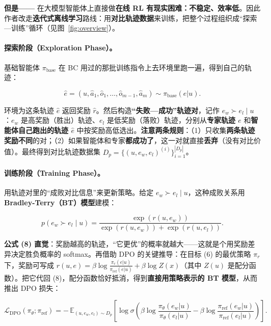 \documentclass[11pt,UTF8,fontset=fandol]{ctexart}
\begin{document}
\textbf{但是——} 在大模型智能体上直接做\textbf{在线 RL 有现实困难：不稳定、效率低}。因此作者改走\textbf{迭代式离线学习}路线：用\textbf{对比轨迹数据}来训练，把整个过程组织成“探索—训练”循环（见图~\ref{fig:overview}）。

\paragraph{探索阶段（Exploration Phase）。} 基础智能体 $\pi_{\text{base}}$ 在 BC 用过的那批训练指令上去环境里跑一遍，得到自己的轨迹：

\begin{equation*}
\hat{e} = (u, \hat{a}_1, \hat{o}_1, \dots, \hat{o}_{m-1}, \hat{a}_m) \sim \pi_{\text{base}}(e|u). \tag{7}
\end{equation*}

环境为这条轨迹 $\hat{e}$ 返回奖励 $\hat{r}$。然后构造\textbf{“失败—成功”轨迹对}，记作 $e_w \succ e_l \mid u$：$e_w$ 是高奖励（胜出）轨迹、$e_l$ 是低奖励（落败）轨迹，分别从\textbf{专家轨迹 $e$} 和\textbf{智能体自己跑出的轨迹 $\hat{e}$} 中按奖励高低选出。\textbf{注意两条规则}：（1）只收集\textbf{两条轨迹奖励不同}的对；（2）如果智能体和专家\textbf{都成功了}，这一对就直接\textbf{丢弃}（没有对比价值）。最终得到对比轨迹数据集 $D_p = \{(u, e_w, e_l)^{(i)}\}_{i=1}^{|D_p|}$。

\paragraph{训练阶段（Training Phase）。} 用轨迹对里的“成败对比信息”来更新策略。给定 $e_w \succ e_l \mid u$，这种成败关系用 \textbf{Bradley-Terry（BT）模型}建模：

\begin{equation*}
p(e_w \succ e_l \mid u) = \frac{\exp(r(u, e_w))}{\exp(r(u, e_w)) + \exp(r(u, e_l))}. \tag{8}
\end{equation*}

\textbf{公式 (8) 直觉}：奖励越高的轨迹，“它更优”的概率就越大——这就是个用奖励差异决定胜负概率的 softmax。再借助 DPO 的关键推导：在目标 (6) 的最优策略 $\pi_r$ 下，奖励可写成 $r(u,e)=\beta\log\frac{\pi_r(e|u)}{\pi_{\text{ref}}(e|u)} + \beta\log Z(x)$（其中 $Z(u)$ 是配分函数）。把它代回 (8)，配分函数恰好抵消，得到\textbf{直接用策略表示的 BT 模型}，从而推出 DPO 损失：

\begin{equation*}
\mathcal{L}_{\text{DPO}}(\pi_\theta; \pi_{\text{ref}}) = -\,\mathbb{E}_{(u,e_w,e_l)\sim D_p}\left[\log\sigma\!\left(\beta\log\frac{\pi_\theta(e_w|u)}{\pi_\theta(e_l|u)} - \beta\log\frac{\pi_{\text{ref}}(e_w|u)}{\pi_{\text{ref}}(e_l|u)}\right)\right]. \tag{11}
\end{equation*}
\end{document}
